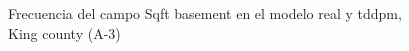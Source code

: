 \begin{figure}[H]
    \centering
    
    \caption{Frecuencia del campo Sqft basement en el modelo real y tddpm, King county (A-3)}
    \label{frecuency-tddpm-sqft basement}
\end{figure}